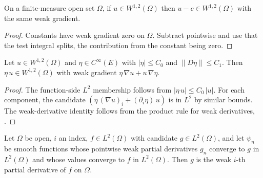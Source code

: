 \begin{lemma}
\label{lem:MemW1pWitness_sub_const}
\leanok
{}
On a finite-measure open set $\Omega$, if $u \in W^{1,2}(\Omega)$ then
$u - c \in W^{1,2}(\Omega)$ with the same weak gradient.
\end{lemma}

\begin{proof}
\leanok
{}

Constants have weak gradient zero on $\Omega$. Subtract pointwise and use
that the test integral splits, the contribution from the constant being
zero.
\end{proof}

\begin{lemma}
\label{lem:MemW1pWitness_mul_smooth_bounded}
\leanok
{}
Let $u \in W^{1,2}(\Omega)$ and $\eta \in C^\infty(E)$ with
$|\eta| \le C_0$ and $\|D\eta\| \le C_1$. Then $\eta\, u \in W^{1,2}(\Omega)$
with weak gradient $\eta\, \nabla u + u\, \nabla \eta$.
\end{lemma}

\begin{proof}
\leanok
{}

The function-side $L^2$ membership follows from $|\eta\, u| \le C_0\,|u|$.
For each component, the candidate $(\eta\, (\nabla u)_i + (\partial_i \eta)\,u)$
is in $L^2$ by similar bounds. The weak-derivative identity follows from
the product rule for weak derivatives, .
\end{proof}

\begin{theorem}
\label{thm:HasWeakPartialDeriv_of_eLpNormApprox}
\leanok
{}
Let $\Omega$ be open, $i$ an index, $f \in L^2(\Omega)$ with candidate
$g \in L^2(\Omega)$, and let $\psi_n$ be smooth functions whose pointwise
weak partial derivatives $g_n$ converge to $g$ in $L^2(\Omega)$ and whose
values converge to $f$ in $L^2(\Omega)$. Then $g$ is the weak $i$-th
partial derivative of $f$ on $\Omega$.
\end{theorem}

